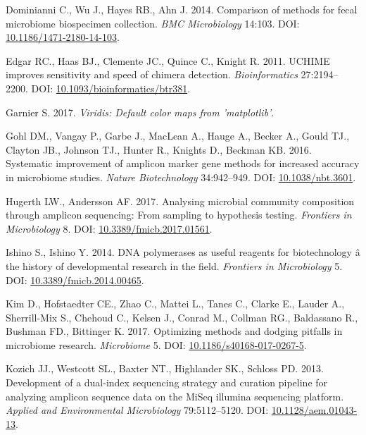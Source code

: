 \documentclass[12pt,]{article}
\begin{document}
\hypertarget{ref-preservation_Dominianni_2014}{}
Dominianni C., Wu J., Hayes RB., Ahn J. 2014. Comparison of methods for
fecal microbiome biospecimen collection. \emph{BMC Microbiology} 14:103.
DOI:
\href{https://doi.org/10.1186/1471-2180-14-103}{10.1186/1471-2180-14-103}.

\hypertarget{ref-uchime_Edgar_2011}{}
Edgar RC., Haas BJ., Clemente JC., Quince C., Knight R. 2011. UCHIME
improves sensitivity and speed of chimera detection.
\emph{Bioinformatics} 27:2194--2200. DOI:
\href{https://doi.org/10.1093/bioinformatics/btr381}{10.1093/bioinformatics/btr381}.

\hypertarget{ref-viridis_citation_2017}{}
Garnier S. 2017. \emph{Viridis: Default color maps from 'matplotlib'}.

\hypertarget{ref-taq_Gohl_2016}{}
Gohl DM., Vangay P., Garbe J., MacLean A., Hauge A., Becker A., Gould
TJ., Clayton JB., Johnson TJ., Hunter R., Knights D., Beckman KB. 2016.
Systematic improvement of amplicon marker gene methods for increased
accuracy in microbiome studies. \emph{Nature Biotechnology} 34:942--949.
DOI: \href{https://doi.org/10.1038/nbt.3601}{10.1038/nbt.3601}.

\hypertarget{ref-review_Hugerth_2017}{}
Hugerth LW., Andersson AF. 2017. Analysing microbial community
composition through amplicon sequencing: From sampling to hypothesis
testing. \emph{Frontiers in Microbiology} 8. DOI:
\href{https://doi.org/10.3389/fmicb.2017.01561}{10.3389/fmicb.2017.01561}.

\hypertarget{ref-polymerase_Ishino_2014}{}
Ishino S., Ishino Y. 2014. DNA polymerases as useful reagents for
biotechnology â the history of developmental research in the field.
\emph{Frontiers in Microbiology} 5. DOI:
\href{https://doi.org/10.3389/fmicb.2014.00465}{10.3389/fmicb.2014.00465}.

\hypertarget{ref-review_Kim_2017}{}
Kim D., Hofstaedter CE., Zhao C., Mattei L., Tanes C., Clarke E., Lauder
A., Sherrill-Mix S., Chehoud C., Kelsen J., Conrad M., Collman RG.,
Baldassano R., Bushman FD., Bittinger K. 2017. Optimizing methods and
dodging pitfalls in microbiome research. \emph{Microbiome} 5. DOI:
\href{https://doi.org/10.1186/s40168-017-0267-5}{10.1186/s40168-017-0267-5}.

\hypertarget{ref-protocol_Kozich_2013}{}
Kozich JJ., Westcott SL., Baxter NT., Highlander SK., Schloss PD. 2013.
Development of a dual-index sequencing strategy and curation pipeline
for analyzing amplicon sequence data on the MiSeq illumina sequencing
platform. \emph{Applied and Environmental Microbiology} 79:5112--5120.
DOI: \href{https://doi.org/10.1128/aem.01043-13}{10.1128/aem.01043-13}.
\end{document}
